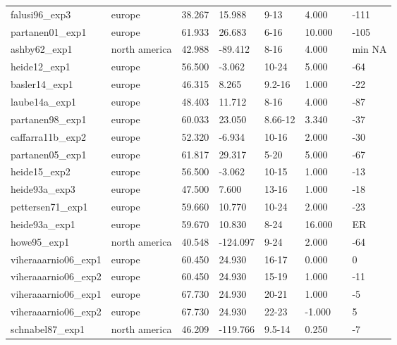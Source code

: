 \documentclass{article}
\begin{document}
\begin{table}[ht]
\begin{tabular}{|p{}|p{}|p{}|p{}|p{}|p{}|p{}|p{}|}
  falusi96\_exp3 & europe & 38.267 & 15.988 & 9-13 & 4.000 &  & -111 \\ 
  partanen01\_exp1 & europe & 61.933 & 26.683 & 6-16 & 10.000 &  & -105 \\ 
  ashby62\_exp1 & north america & 42.988 & -89.412 & 8-16 & 4.000 &  & min NA \\ 
  heide12\_exp1 & europe & 56.500 & -3.062 & 10-24 & 5.000 &  & -64 \\ 
  basler14\_exp1 & europe & 46.315 & 8.265 & 9.2-16 & 1.000 &  & -22 \\ 
  laube14a\_exp1 & europe & 48.403 & 11.712 & 8-16 & 4.000 &  & -87 \\ 
  partanen98\_exp1 & europe & 60.033 & 23.050 & 8.66-12 & 3.340 &  & -37 \\ 
  caffarra11b\_exp2 & europe & 52.320 & -6.934 & 10-16 & 2.000 &  & -30 \\ 
  partanen05\_exp1 & europe & 61.817 & 29.317 & 5-20 & 5.000 &  & -67 \\ 
  heide15\_exp2 & europe & 56.500 & -3.062 & 10-15 & 1.000 &  & -13 \\ 
  heide93a\_exp3 & europe & 47.500 & 7.600 & 13-16 & 1.000 &  & -18 \\ 
  pettersen71\_exp1 & europe & 59.660 & 10.770 & 10-24 & 2.000 &  & -23 \\ 
  heide93a\_exp1 & europe & 59.670 & 10.830 & 8-24 & 16.000 &  & ER \\ 
  howe95\_exp1 & north america & 40.548 & -124.097 & 9-24 & 2.000 &  & -64 \\ 
  viheraaarnio06\_exp1 & europe & 60.450 & 24.930 & 16-17 & 0.000 &  & 0 \\ 
  viheraaarnio06\_exp2 & europe & 60.450 & 24.930 & 15-19 & 1.000 &  & -11 \\ 
  viheraaarnio06\_exp1 & europe & 67.730 & 24.930 & 20-21 & 1.000 &  & -5 \\ 
  viheraaarnio06\_exp2 & europe & 67.730 & 24.930 & 22-23 & -1.000 &  & 5 \\ 
  schnabel87\_exp1 & north america & 46.209 & -119.766 & 9.5-14 & 0.250 &  & -7 \\ 
   \hline
\end{tabular}
\end{table}\clearpage
\end{document}
